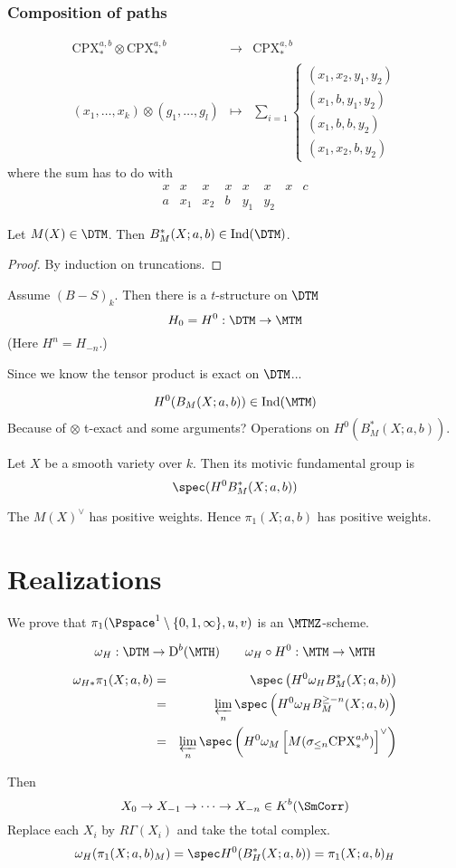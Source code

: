 \subsubsection{Composition of paths}
\[
\begin{array}{rcl}
\mathrm{CPX}_*^{a,b} \otimes \mathrm{CPX}_*^{a,b} & \to & \mathrm{CPX}_*^{a,b} \\
(x_1, \ldots, x_k) \otimes (g_1, \ldots, g_l) & \mapsto & \sum_{i=1} \left\{ \begin{array}{l}
(x_1,x_2,y_1,y_2) \\
(x_1,b,y_1,y_2) \\
(x_1,b,b,y_2) \\
(x_1,x_2,b,y_2)
\end{array} \right.
\end{array}
\]
where the sum has to do with
\[
\begin{array}{cccccccc}
x & x & x & x & x & x & x & c \\
a & x_1 & x_2 & b & y_1 & y_2 & &
\end{array}
\]

\begin{prop}
Let $M(X) \in \DTM$. Then $B_M^*(X;a,b) \in \mathrm{Ind}(\DTM)$.
\end{prop}
\begin{proof}
By induction on truncations.
\end{proof}
\begin{prop}
Assume $(B-S)_k$. Then there is a $t$-structure on $\DTM$
\[
H_0 = H^0 : \DTM \to \MTM
\]
(Here $H^n = H_{-n}$.)
\end{prop}
Since we know the tensor product is exact on $\DTM$...

\[
H^0(B_M(X;a,b)) \in \mathrm{Ind}(\MTM)
\]
Because of $\otimes$ t-exact and some arguments?
Operations on $H^0(B_M^*(X;a,b))$.
\begin{defn}
Let $X$ be a smooth variety over $k$. Then its motivic fundamental group is
\[
\spec (H^0 B_M^*(X;a,b))
\]
\end{defn}
The $M(X)^{\vee}$ has positive weights. Hence $\pi_1(X;a,b)$ has positive weights.

\section{Realizations}
We prove that $\pi_1(\Pspace^1 \setminus \{0,1,\infty\}, u,v)$ is an $\MTMZ$-scheme.

\[
\omega_H : \DTM \to \mathrm{D}^b(\MTH) \qquad \omega_H \circ H^0 : \MTM \to \MTH
\]

\begin{eqnarray*}
\omega_{H*} \pi_1(X;a,b) & = & \spec \left( H^0 \omega_H B_M^*(X;a,b) \right) \\
& = & \varprojlim_n \spec \left( H^0 \omega_H B_M^{\geq -n}(X;a,b) \right) \\
& = & \varprojlim_n \spec \left( H^0 \omega_M \left[ M(\sigma_{\leq n} \mathrm{CPX}_*^{a,b})\right]^{\vee} \right)
\end{eqnarray*}

Then
\[
X_0 \to X_{-1} \to \cdots \to X_{-n} \in K^b(\SmCorr)
\]
Replace each $X_i$ by $R\Gamma(X_i)$ and take the total complex.
\[
\omega_H(\pi_1(X;a,b)_M) = \spec H^0(B_H^*(X;a,b)) = \pi_1(X;a,b)_H
\]
